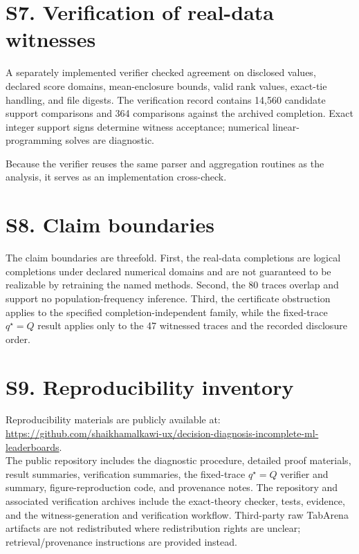 \documentclass[11pt]{article}
\begin{document}
\section*{S7. Verification of real-data witnesses}
A separately implemented verifier checked agreement on disclosed values, declared score domains, mean-enclosure bounds, valid rank values, exact-tie handling, and file digests. The verification record contains 14,560 candidate support comparisons and 364 comparisons against the archived completion. Exact integer support signs determine witness acceptance; numerical linear-programming solves are diagnostic.

Because the verifier reuses the same parser and aggregation routines as the analysis, it serves as an implementation cross-check.

\section*{S8. Claim boundaries}
The claim boundaries are threefold. First, the real-data completions are logical completions under declared numerical domains and are not guaranteed to be realizable by retraining the named methods. Second, the 80 traces overlap and support no population-frequency inference. Third, the certificate obstruction applies to the specified completion-independent family, while the fixed-trace $q^\star=Q$ result applies only to the 47 witnessed traces and the recorded disclosure order.

\section*{S9. Reproducibility inventory}
Reproducibility materials are publicly available at:\\
\url{https://github.com/shaikhamalkawi-ux/decision-diagnosis-incomplete-ml-leaderboards}.\\
The public repository includes the diagnostic procedure, detailed proof materials, result summaries, verification summaries, the fixed-trace $q^\star=Q$ verifier and summary, figure-reproduction code, and provenance notes. The repository and associated verification archives include the exact-theory checker, tests, evidence, and the witness-generation and verification workflow. Third-party raw TabArena artifacts are not redistributed where redistribution rights are unclear; retrieval/provenance instructions are provided instead.
\end{document}
